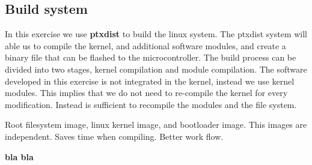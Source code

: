 \subsection{Build system}
In this exercise we use {\bf ptxdist} to build the linux system. The ptxdist system will able us to compile the kernel, and additional software modules, and create a binary file that can be flashed to the microcontroller. The build process can be divided into two stages, kernel compilation and module compilation. The software developed in this exercise is not integrated in the kernel, instead we use kernel modules. This implies that we do not need to re-compile the kernel for every modification. Instead is sufficient to recompile the modules and the file system. 


Root filesystem image, linux kernel image, and bootloader image. This images are independent. Saves time when compiling. Better work flow. 

{\bf bla bla}

 